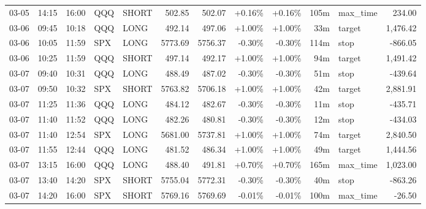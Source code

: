 \documentclass[11pt,a4paper,twoside]{article}
\begin{document}
\begin{center}
\begin{longtable}{>{\color{txtmain}}l l l l l r r r r r >{\color{txtmain}}l r}
03-05 & 14:15 & 16:00 & QQQ & SHORT & 502.85 & 502.07 & \textcolor{wingreen}{+0.16\%} & \textcolor{wingreen}{+0.16\%} & 105m & max\_time & \textcolor{wingreen}{234.00} \\
03-06 & 09:45 & 10:18 & QQQ & LONG & 492.14 & 497.06 & \textcolor{wingreen}{+1.00\%} & \textcolor{wingreen}{+1.00\%} & 33m & target & \textcolor{wingreen}{1,476.42} \\
03-06 & 10:05 & 11:59 & SPX & LONG & 5773.69 & 5756.37 & \textcolor{lossred}{-0.30\%} & \textcolor{lossred}{-0.30\%} & 114m & stop & \textcolor{lossred}{-866.05} \\
03-06 & 10:25 & 11:59 & QQQ & SHORT & 497.14 & 492.17 & \textcolor{wingreen}{+1.00\%} & \textcolor{wingreen}{+1.00\%} & 94m & target & \textcolor{wingreen}{1,491.42} \\
03-07 & 09:40 & 10:31 & QQQ & LONG & 488.49 & 487.02 & \textcolor{lossred}{-0.30\%} & \textcolor{lossred}{-0.30\%} & 51m & stop & \textcolor{lossred}{-439.64} \\
03-07 & 09:50 & 10:32 & SPX & SHORT & 5763.82 & 5706.18 & \textcolor{wingreen}{+1.00\%} & \textcolor{wingreen}{+1.00\%} & 42m & target & \textcolor{wingreen}{2,881.91} \\
03-07 & 11:25 & 11:36 & QQQ & LONG & 484.12 & 482.67 & \textcolor{lossred}{-0.30\%} & \textcolor{lossred}{-0.30\%} & 11m & stop & \textcolor{lossred}{-435.71} \\
03-07 & 11:40 & 11:52 & QQQ & LONG & 482.26 & 480.81 & \textcolor{lossred}{-0.30\%} & \textcolor{lossred}{-0.30\%} & 12m & stop & \textcolor{lossred}{-434.03} \\
03-07 & 11:40 & 12:54 & SPX & LONG & 5681.00 & 5737.81 & \textcolor{wingreen}{+1.00\%} & \textcolor{wingreen}{+1.00\%} & 74m & target & \textcolor{wingreen}{2,840.50} \\
03-07 & 11:55 & 12:44 & QQQ & LONG & 481.52 & 486.34 & \textcolor{wingreen}{+1.00\%} & \textcolor{wingreen}{+1.00\%} & 49m & target & \textcolor{wingreen}{1,444.56} \\
03-07 & 13:15 & 16:00 & QQQ & LONG & 488.40 & 491.81 & \textcolor{wingreen}{+0.70\%} & \textcolor{wingreen}{+0.70\%} & 165m & max\_time & \textcolor{wingreen}{1,023.00} \\
03-07 & 13:40 & 14:20 & SPX & SHORT & 5755.04 & 5772.31 & \textcolor{lossred}{-0.30\%} & \textcolor{lossred}{-0.30\%} & 40m & stop & \textcolor{lossred}{-863.26} \\
03-07 & 14:20 & 16:00 & SPX & SHORT & 5769.16 & 5769.69 & \textcolor{lossred}{-0.01\%} & \textcolor{lossred}{-0.01\%} & 100m & max\_time & \textcolor{lossred}{-26.50} \\

\end{longtable}
\end{center}
\end{document}
